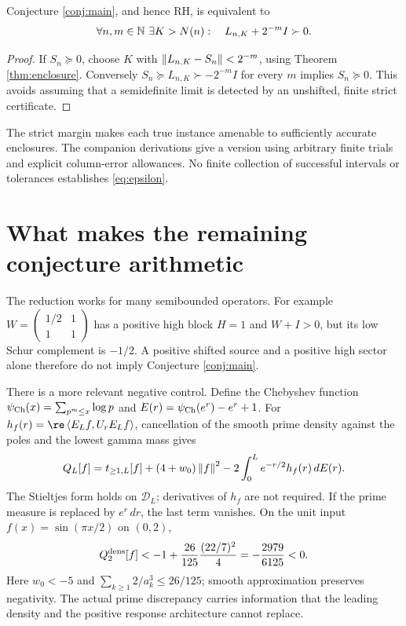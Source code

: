 \begin{corollary}\label{cor:epsilon}
Conjecture \ref{conj:main}, and hence RH, is equivalent to
\begin{equation}\label{eq:epsilon}
\forall n,m\in\mathbb N\ \exists K>N(n):\quad
L_{n,K}+2^{-m}I\succ0.
\end{equation}
\end{corollary}
\begin{proof}
If $S_n\succeq0$, choose $K$ with
$\left\lVert L_{n,K}-S_n\right\rVert<2^{-m}$, using Theorem \ref{thm:enclosure}.
Conversely $S_n\succeq L_{n,K}\succ-2^{-m}I$ for every $m$ implies
$S_n\succeq0$. This avoids assuming that a semidefinite limit is detected
by an unshifted, finite strict certificate.
\end{proof}
The strict margin makes each true instance amenable to sufficiently
accurate enclosures. The companion derivations give a version using arbitrary
finite trials and explicit column-error allowances. No finite collection of
successful intervals or tolerances establishes \eqref{eq:epsilon}.

\section{What makes the remaining conjecture arithmetic}
The reduction works for many semibounded operators. For example
$W=\left(\begin{smallmatrix}1/2&1\\1&1\end{smallmatrix}\right)$ has
a positive high block $H=1$ and $W+I>0$, but its low Schur complement is
$-1/2$. A positive shifted source and a positive high sector alone therefore
do not imply Conjecture \ref{conj:main}.

There is a more relevant negative control. Define the Chebyshev function
$\psi_{\rm Ch}(x)=\sum_{p^m\le x}\log p$ and
$E(r)=\psi_{\rm Ch}(e^r)-e^r+1$. For
$h_f(r)=\re\ip{E_Lf}{U_rE_Lf}$, cancellation of the smooth prime density
against the poles and the lowest gamma mass gives
\begin{equation}\label{eq:discrepancy}
Q_L[f]=t_{\ge1,L}[f]+(4+w_0)\left\lVert f\right\rVert^2
-2\int_0^L e^{-r/2}h_f(r)\,dE(r).
\end{equation}
The Stieltjes form holds on $\mathcal D_L$; derivatives of $h_f$ are not
required. If the prime measure is replaced by $e^r\,dr$, the last term
vanishes. On the unit input $f(x)=\sin(\pi x/2)$ on $(0,2)$,
\[
Q_2^{\rm dens}[f]<-1+\frac{26}{125}\frac{(22/7)^2}{4}
=-\frac{2979}{6125}<0.
\]
Here $w_0<-5$ and
$\sum_{k\ge1}2/a_k^3\le26/125$; smooth approximation preserves negativity.
The actual prime discrepancy carries information that the leading density
and the positive response architecture cannot replace.

